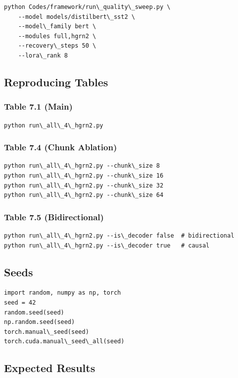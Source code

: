 \begin{lstlisting}
python Codes/framework/run\_quality\_sweep.py \
    --model models/distilbert\_sst2 \
    --model\_family bert \
    --modules full,hgrn2 \
    --recovery\_steps 50 \
    --lora\_rank 8
\end{lstlisting}

\subsection{Reproducing Tables}

\subsubsection{Table 7.1 (Main)}
\begin{lstlisting}
python run\_all\_4\_hgrn2.py
\end{lstlisting}

\subsubsection{Table 7.4 (Chunk Ablation)}
\begin{lstlisting}
python run\_all\_4\_hgrn2.py --chunk\_size 8
python run\_all\_4\_hgrn2.py --chunk\_size 16
python run\_all\_4\_hgrn2.py --chunk\_size 32
python run\_all\_4\_hgrn2.py --chunk\_size 64
\end{lstlisting}

\subsubsection{Table 7.5 (Bidirectional)}
\begin{lstlisting}
python run\_all\_4\_hgrn2.py --is\_decoder false  # bidirectional
python run\_all\_4\_hgrn2.py --is\_decoder true   # causal
\end{lstlisting}

\subsection{Seeds}

\begin{lstlisting}
import random, numpy as np, torch
seed = 42
random.seed(seed)
np.random.seed(seed)
torch.manual\_seed(seed)
torch.cuda.manual\_seed\_all(seed)
\end{lstlisting}

\subsection{Expected Results}

